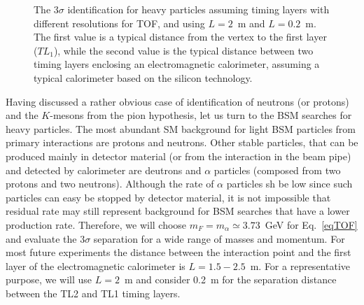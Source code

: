 \begin{figure}
\begin{center}
\end{center}
\caption{
The $3\sigma$ identification for heavy particles assuming timing layers with different resolutions for TOF, and using $L=2$~m and $L=0.2$~m.
The first value is a typical distance
from the vertex to the first layer ($TL_1$), while the second value is the typical  distance
between two timing layers enclosing an electromagnetic calorimeter, assuming a typical calorimeter
based on the silicon technology.
}
\label{fig:signgleBSM}
\end{figure}


Having discussed a rather obvious case of identification of neutrons (or protons) and the $K$-mesons from the pion hypothesis,
let us turn to the BSM searches for heavy particles.
The most abundant SM background for light BSM  particles from primary interactions are protons and neutrons.
Other stable particles, that can be produced mainly in 
detector material (or from the interaction in the beam pipe) 
and detected by calorimeter are deutrons and $\alpha$ particles (composed from two protons and two neutrons). 
Although the rate of $\alpha$ particles sh be low since such particles can easy be stopped by detector material,
it is not impossible that residual rate may still  represent background for BSM searches that have a lower production rate.  
Therefore, we will choose  $m_F=m_{\alpha}\simeq 3.73$~GeV  for Eq.~\ref{eqTOF} and evaluate the
$3\sigma$ separation for a wide range of masses and momentum.
For most future experiments the distance between the 
interaction point and the first layer of the electromagnetic calorimeter is 
$L=1.5-2.5$~m. For a representative purpose, we will use $L=2$~m and consider 0.2~m for the  separation
distance between the TL2 and TL1 timing layers.

